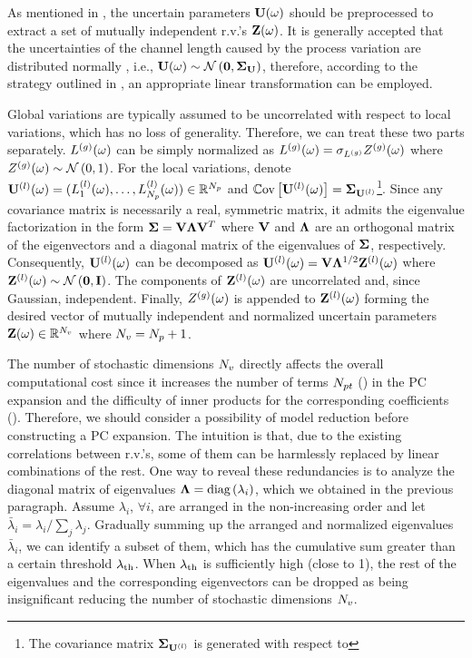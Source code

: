 As mentioned in , the uncertain parameters $\mathbf{U}(\omega)$ should be preprocessed to extract a set of mutually independent r.v.'s $\mathbf{Z}(\omega)$. It is generally accepted that the uncertainties of the channel length caused by the process variation are distributed normally \cite{srivastava2010, liu2007, juan2012}, i.e., $\vU(\o) \sim \normal{\vZero}{\mCov_\vU}$, therefore, according to the strategy outlined in , an appropriate linear transformation can be employed.

Global variations are typically assumed to be uncorrelated with respect to local variations, which has no loss of generality. Therefore, we can treat these two parts separately. ${L^{(g)}}(\omega)$ can be simply normalized as ${L^{(g)}}(\omega) = \sigma_{L^{(g)}} {Z^{(g)}}(\omega)$ where ${Z^{(g)}}(\omega) \sim \mathcal{N}\left( 0, 1 \right)$. For the local variations, denote ${\mathbf{U}^{(l)}}(\omega) = (L^{(l)}_1(\omega), \dotsc, L^{(l)}_{N_p}(\omega)) \in \mathbb{R}^{N_p}$ and $\oCov{\vlLeff(\o)} = \mCov_\vlLeff$\footnote{The covariance matrix $\mCov_\vlLeff$ is generated with respect to }. Since any covariance matrix is necessarily a real, symmetric matrix, it admits the eigenvalue factorization \cite{press2007} in the form $\mCov = \m{V} \m{\Lambda} \m{V}^T$ where $\m{V}$ and $\m{\Lambda}$ are an orthogonal matrix of the eigenvectors and a diagonal matrix of the eigenvalues of $\mCov$, respectively. Consequently, ${\mathbf{U}^{(l)}}(\omega)$ can be decomposed as $\vlLeff(\o) = \m{V} \m{\Lambda}^\ifrac{1}{2} \vlZ(\o)$ where $\vlZ(\o) \sim \normal{\vZero}{\mI}$. The components of ${\mathbf{Z}^{(l)}}(\omega)$ are uncorrelated and, since Gaussian, independent. Finally, ${Z^{(g)}}(\omega)$ is appended to ${\mathbf{Z}^{(l)}}(\omega)$ forming the desired vector of mutually independent and normalized uncertain parameters $\mathbf{Z}(\omega) \in \mathbb{R}^{N_v}$ where ${N_v} = {N_p} + 1$.

The number of stochastic dimensions ${N_v}$ directly affects the overall computational cost since it increases the number of terms ${N_{pt}}$ () in the PC expansion and the difficulty of inner products for the corresponding coefficients (). Therefore, we should consider a possibility of model reduction before constructing a PC expansion. The intuition is that, due to the existing correlations between r.v.'s, some of them can be harmlessly replaced by linear combinations of the rest. One way to reveal these redundancies is to analyze the diagonal matrix of eigenvalues $\m{\Lambda} = \diag{ \lambda_i }$, which we obtained in the previous paragraph. Assume $\lambda_i$, $\forall i$, are arranged in the non-increasing order and let $\bar{\lambda}_i = \lambda_i / \sum_j \lambda_j$. Gradually summing up the arranged and normalized eigenvalues $\bar{\lambda}_i$, we can identify a subset of them, which has the cumulative sum greater than a certain threshold $\lambda_\text{th}$. When $\lambda_\text{th}$ is sufficiently high (close to 1), the rest of the eigenvalues and the corresponding eigenvectors can be dropped as being insignificant reducing the number of stochastic dimensions ${N_v}$.

